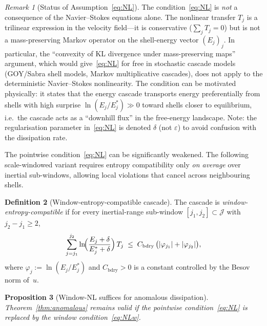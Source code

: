 \documentclass[12pt,a4paper]{article}
\theoremstyle{definition}
\newtheorem{definition}{Definition}[section]
\theoremstyle{plain}
\newtheorem{proposition}[definition]{Proposition}
\theoremstyle{remark}
\newtheorem{remark}[definition]{Remark}
\begin{document}
\begin{remark}[Status of Assumption~\eqref{eq:NL}]
The condition~\eqref{eq:NL} is \emph{not} a consequence of the Navier--Stokes
equations alone.  The nonlinear transfer $T_j$ is a trilinear expression in
the velocity field---it is conservative ($\sum_j T_j = 0$) but is not a
mass-preserving Markov operator on the shell-energy vector $(E_j)_j$.
In particular, the ``convexity of KL divergence under mass-preserving maps''
argument, which would give~\eqref{eq:NL} for free in stochastic cascade
models (GOY/Sabra shell models, Markov multiplicative cascades), does not
apply to the deterministic Navier--Stokes nonlinearity.  The condition
can be motivated physically: it states that the energy cascade transports
energy preferentially from shells with high surprise
$\ln(E_j/E_j^*) \gg 0$ toward shells closer to equilibrium, i.e.\
the cascade acts as a ``downhill flux'' in the free-energy landscape.
Note: the regularisation parameter in~\eqref{eq:NL} is denoted $\delta$
(not $\varepsilon$) to avoid confusion with the dissipation rate.
\end{remark}

The pointwise condition~\eqref{eq:NL} can be significantly weakened.
The following scale-windowed variant requires entropy compatibility
only \emph{on average} over inertial sub-windows, allowing local
violations that cancel across neighbouring shells.

\begin{definition}[Window-entropy-compatible cascade]\label{def:NLw}
The cascade is \emph{window-entropy-compatible} if for every
inertial-range sub-window $[j_1, j_2] \subset \mathcal{J}$ with
$j_2 - j_1 \ge 2$,
\begin{equation}\label{eq:NLw}
  \sum_{j=j_1}^{j_2}
  \ln\!\Bigl(\frac{E_j + \delta}{E_j^* + \delta}\Bigr)\,T_j
  \;\le\;
  C_{\mathrm{bdry}}\,
  \bigl(|\varphi_{j_1}| + |\varphi_{j_2}|\bigr),
\end{equation}
where $\varphi_j := \ln(E_j/E_j^*)$ and $C_{\mathrm{bdry}} > 0$ is a
constant controlled by the Besov norm of~$u$.
\end{definition}

\begin{proposition}[Window-NL suffices for anomalous dissipation]
\label{prop:window-NL}
Theorem~\ref{thm:anomalous} remains valid if the pointwise
condition~\eqref{eq:NL} is replaced by the window
condition~\eqref{eq:NLw}.
\end{proposition}
\end{document}
